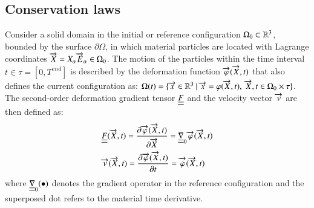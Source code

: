 \subsection{Conservation laws}
Consider a solid domain in the initial or reference configuration $\Omega_0 \subset \mathbb{R}^3$, bounded by the surface $\partial \Omega$, in which material particles are located with Lagrange coordinates ${\overrightarrow{X}}=X_\alpha{\overrightarrow{E}}_\alpha \in \Omega_0$.
The motion of the particles within the time interval $t\in\tau= [0,T^{end}]$ is described by the deformation function ${\overrightarrow{\varphi}}({\overrightarrow{X}},t)$ that also defines the current configuration as: $\Omega(t)=\{{\overrightarrow{x}} \in \mathbb{R}^3 \: \lvert \: {\overrightarrow{x}}=\varphi({\overrightarrow{X}},t), \:{\overrightarrow{X}},t \in \Omega_0\times\tau\}$.
The second-order deformation gradient tensor ${\underline{\underline{F}}}$ and the velocity vector ${\overrightarrow{v}}$ are then defined as:
\begin{align}
  \label{eq:deformation_gradient}
  &{\underline{\underline{F}}}({\overrightarrow{X}},t) = \frac{\partial {\overrightarrow{\varphi}}({\overrightarrow{X}},t)}{\partial {\overrightarrow{X}}} = {\underline{\underline{\nabla}}}_0 {\overrightarrow{\varphi}}({\overrightarrow{X}},t) \\
  \label{eq:velocity}
  & {\overrightarrow{v}}({\overrightarrow{X}},t)= \frac{\partial {\overrightarrow{\varphi}}({\overrightarrow{X}},t)}{\partial t} = {\overrightarrow{\dot{\varphi}}}({\overrightarrow{X}},t)
\end{align}
where ${\underline{\underline{\nabla}}}_{0}(\bullet)$ denotes the gradient operator in the reference configuration and the superposed dot refers to the material time derivative.

